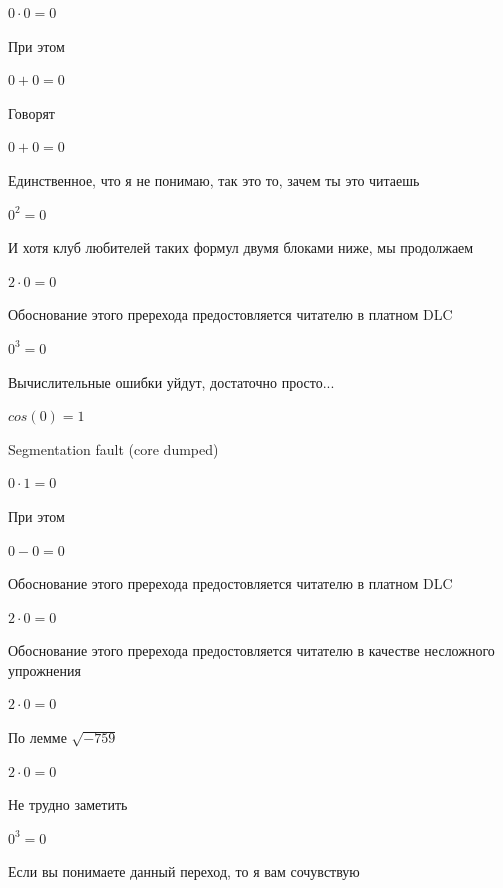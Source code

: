 \documentclass[12pt,a4paper,fleqn]{article}
\begin{document}
\begin{center}$0 \cdot 0 = 0$\end{center}
При этом

\begin{center}$0+0 = 0$\end{center}
Говорят

\begin{center}$0+0 = 0$\end{center}
Единственное, что я не понимаю, так это то, зачем ты это читаешь

\begin{center}$0^{2} = 0$\end{center}
И хотя клуб любителей таких формул двумя блоками ниже, мы продолжаем

\begin{center}$2 \cdot 0 = 0$\end{center}
Обоснование этого пререхода предостовляется читателю в платном DLC

\begin{center}$0^{3} = 0$\end{center}
Вычислительные ошибки уйдут, достаточно просто...

\begin{center}$cos(0) = 1$\end{center}
Segmentation fault (core dumped)

\begin{center}$0 \cdot 1 = 0$\end{center}
При этом

\begin{center}$0-0 = 0$\end{center}
Обоснование этого пререхода предостовляется читателю в платном DLC

\begin{center}$2 \cdot 0 = 0$\end{center}
Обоснование этого пререхода предостовляется читателю в качестве несложного упрожнения

\begin{center}$2 \cdot 0 = 0$\end{center}
По лемме $\sqrt{-759}$
\begin{center}$2 \cdot 0 = 0$\end{center}
Не трудно заметить

\begin{center}$0^{3} = 0$\end{center}
Если вы понимаете данный переход, то я вам сочувствую
\end{document}
